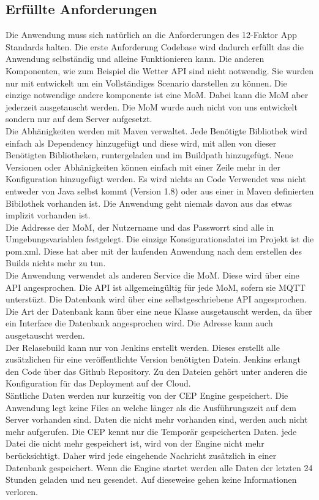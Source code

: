 \subsection{Erfüllte Anforderungen}
Die Anwendung muss sich natürlich an die Anforderungen des 12-Faktor App Standards halten. Die erste Anforderung Codebase wird dadurch erfüllt das die Anwendung selbständig und alleine Funktionieren kann. Die anderen Komponenten, wie zum Beispiel die Wetter API sind nicht notwendig. Sie wurden nur mit entwickelt um ein Vollständiges Scenario darstellen zu können. Die einzige notwendige andere komponente ist eine MoM. Dabei kann die MoM aber jederzeit ausgetauscht werden. Die MoM wurde auch nicht von uns entwickelt sondern nur auf dem Server aufgesetzt. 
\\
Die Abhänigkeiten werden mit Maven verwaltet. Jede Benötigte Bibliothek wird einfach als Dependency hinzugefügt und diese wird, mit allen von dieser Benötigten Bibliotheken, runtergeladen und im Buildpath hinzugefügt. Neue Versionen oder Abhänigkeiten können einfach mit einer Zeile mehr in der Konfiguration hinzugefügt werden. Es wird nichts an Code Verwendet was nicht entweder von Java selbst kommt (Version 1.8) oder aus einer in Maven definierten Bibilothek vorhanden ist. Die Anwendung geht niemals davon aus das etwas implizit vorhanden ist.
\\
Die Addresse der MoM, der Nutzername und das Passworrt sind alle in Umgebungsvariablen festgelegt. Die einzige Konsigurationsdatei im Projekt ist die pom.xml. Diese hat aber mit der laufenden Anwendung nach dem erstellen des Builds nichts mehr zu tun. 
\\
Die Anwendung verwendet als anderen Service die MoM. Diese wird über eine API angesprochen. Die API ist allgemeingültig für jede MoM, sofern sie MQTT unterstüzt. Die Datenbank wird über eine selbstgeschriebene API angesprochen. Die Art der Datenbank kann über eine neue Klasse ausgetauscht werden, da über ein Interface die Datenbank angesprochen wird. Die Adresse kann auch ausgetauscht werden. 
\\
Der Relasebuild kann nur von Jenkins erstellt werden. Dieses erstellt alle zusätzlichen für eine veröffentlichte Version benötigten Datein. Jenkins erlangt den Code über das Github Repository. Zu den Dateien gehört unter anderen die Konfiguration für das Deployment auf der Cloud.
\\
Säntliche Daten werden nur kurzeitig von der CEP Engine gespeichert. Die Anwendung legt keine Files an welche länger als die Ausführungszeit auf dem Server vorhanden sind. Daten die nicht mehr vorhanden sind, werden auch nicht mehr aufgerufen. Die CEP kennt nur die Temporär gespeicherten Daten. jede Datei die nicht mehr gespeichert ist, wird von der Engine nicht mehr berücksichtigt. Daher wird jede eingehende Nachricht zusätzlich in einer Datenbank gespeichert. Wenn die Engine startet werden alle Daten der letzten 24 Stunden geladen und neu gesendet. Auf dieseweise gehen keine Informationen verloren.
